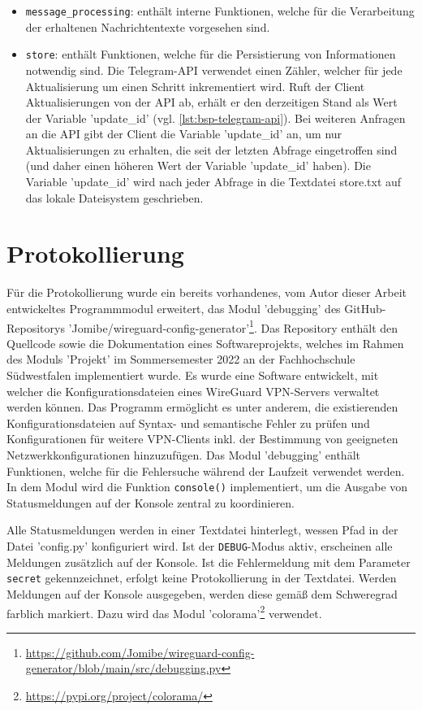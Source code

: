 \begin{itemize}
\item \lstinline{message_processing}: enthält interne Funktionen, welche für die Verarbeitung der erhaltenen Nachrichtentexte vorgesehen sind. 
\item \lstinline{store}: enthält Funktionen, welche für die Persistierung von Informationen notwendig sind. Die Telegram-API verwendet einen Zähler, welcher für jede Aktualisierung um einen Schritt inkrementiert wird. Ruft der Client Aktualisierungen von der API ab, erhält er den derzeitigen Stand als Wert der Variable 'update\_id' (vgl. \autoref{lst:bsp-telegram-api}). Bei weiteren Anfragen an die API gibt der Client die Variable 'update\_id' an, um nur Aktualisierungen zu erhalten, die seit der letzten Abfrage eingetroffen sind (und daher einen höheren Wert der Variable 'update\_id' haben). Die Variable 'update\_id' wird nach jeder Abfrage in die Textdatei store.txt auf das lokale Dateisystem geschrieben.
\end{itemize}

\section{Protokollierung}
\label{sec:protokollierung}

Für die Protokollierung wurde ein bereits vorhandenes, vom Autor dieser Arbeit entwickeltes Programmmodul erweitert, das Modul 'debugging' des GitHub-Repositorys 'Jomibe/wireguard-config-generator'\footnote{\url{https://github.com/Jomibe/wireguard-config-generator/blob/main/src/debugging.py}}. Das Repository enthält den Quellcode sowie die Dokumentation eines Softwareprojekts, welches im Rahmen des Moduls 'Projekt' im Sommersemester 2022 an der Fachhochschule Südwestfalen implementiert wurde. Es wurde eine Software entwickelt, mit welcher die Konfigurationsdateien eines WireGuard VPN-Servers verwaltet werden können. Das Programm ermöglicht es unter anderem, die existierenden Konfigurationsdateien auf Syntax- und semantische Fehler zu prüfen und Konfigurationen für weitere VPN-Clients inkl. der Bestimmung von geeigneten Netzwerkkonfigurationen hinzuzufügen. Das Modul 'debugging' enthält Funktionen, welche für die Fehlersuche während der Laufzeit verwendet werden. In dem Modul wird die Funktion \lstinline{console()} implementiert, um die Ausgabe von Statusmeldungen auf der Konsole zentral zu koordinieren. 

Alle Statusmeldungen werden in einer Textdatei hinterlegt, wessen Pfad in der Datei 'config.py' konfiguriert wird. Ist der \lstinline{DEBUG}-Modus aktiv, erscheinen alle Meldungen zusätzlich auf der Konsole. Ist die Fehlermeldung mit dem Parameter \lstinline{secret} gekennzeichnet, erfolgt keine Protokollierung in der Textdatei. Werden Meldungen auf der Konsole ausgegeben, werden diese gemäß dem Schweregrad farblich markiert. Dazu wird das Modul 'colorama'\footnote{\url{https://pypi.org/project/colorama/}} verwendet.

